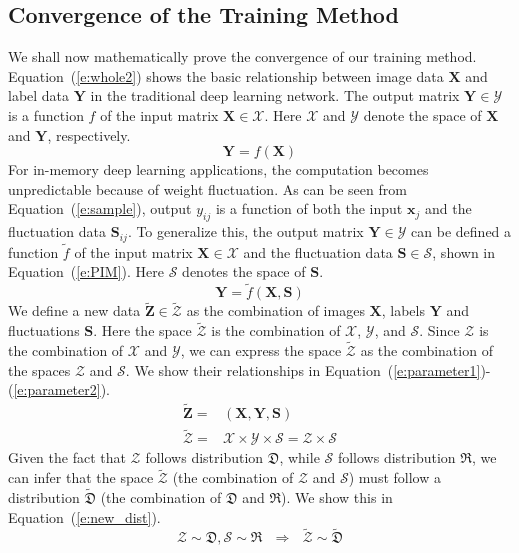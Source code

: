 \documentclass[10pt,journal,compsoc]{IEEEtran}
\begin{document}
\subsection{Convergence of the Training Method}

We shall now mathematically prove the convergence of our training method. 
Equation~(\ref{e:whole2}) shows the basic relationship between image data $\mathbf{X}$ and label data $\mathbf{Y}$ in the traditional deep learning network. The output matrix $\mathbf{Y}\in \mathcal{Y}$ is a function $f$ of the input matrix $\mathbf{X}\in \mathcal{X}$. Here $\mathcal{X}$ and $\mathcal{Y}$ denote the space of $\mathbf{X}$ and $\mathbf{Y}$, respectively. 
\begin{equation}
\mathbf{Y}  = f(\mathbf{X})%
\label{e:whole2}
\end{equation}
For in-memory deep learning applications, the computation becomes unpredictable because of weight fluctuation. As can be seen from Equation~(\ref{e:sample}), output $y_{ij}$ is a function of both the input $\mathbf{x}_j$ and the fluctuation data $\mathbf{S}_{ij}$. To generalize this, the output matrix $\mathbf{Y}\in \mathcal{Y}$ can be defined a function $\widetilde{f}$ of the input matrix $\mathbf{X}\in \mathcal{X}$ and the fluctuation data $\mathbf{S}\in \mathcal{S}$, shown in Equation~(\ref{e:PIM}). Here $\mathcal{S}$ denotes the space of $\mathbf{S}$.
\begin{equation}
\mathbf{Y} = \widetilde{f}(\mathbf{X, S})
\label{e:PIM}
\end{equation}
We define a new data $\widetilde{\mathbf{Z}}\in \widetilde{\mathcal{Z}}$ as the combination of images $\mathbf{X}$, labels $\mathbf{Y}$ and fluctuations $\mathbf{S}$.
Here the space $\widetilde{\mathcal{Z}}$ is the combination of $\mathcal{X}$, $\mathcal{Y}$, and  $\mathcal{S}$. Since  $\mathcal{Z}$ is the combination of $\mathcal{X}$ and $\mathcal{Y}$, we can express the space $\widetilde{\mathcal{Z}}$ as the combination of the spaces $\mathcal{Z}$ and $\mathcal{S}$. We show their relationships in Equation~(\ref{e:parameter1})-(\ref{e:parameter2}).
\begin{align}
\widetilde{\mathbf{Z}}=&(\mathbf{X}, \mathbf{Y}, \mathbf{S})\label{e:parameter1}\\
\widetilde{\mathcal{Z}}=&\mathcal{X}\times \mathcal{Y}\times\mathcal{S}= \mathcal{Z}\times \mathcal{S}
\label{e:parameter2}
\end{align}
Given the fact that $\mathcal{Z}$ follows distribution $\mathfrak{D}$, while $\mathcal{S}$ follows distribution $\mathfrak{R}$, we can infer that the space $\widetilde{\mathcal{Z}}$ (the combination of $\mathcal{Z}$ and $\mathcal{S}$) must follow a distribution $\widetilde{\mathfrak{D}}$ (the combination of $\mathfrak{D}$ and $\mathfrak{R}$). We show this in Equation~(\ref{e:new_dist}).
\begin{equation}
       \mathcal{Z}\sim\mathfrak{D}, \mathcal{S}\sim\mathfrak{R} 
\ \ \ \Rightarrow
\ \ \ \widetilde{\mathcal{Z}}\sim \widetilde{\mathfrak{D}}
\label{e:new_dist}
\end{equation}
\end{document}
